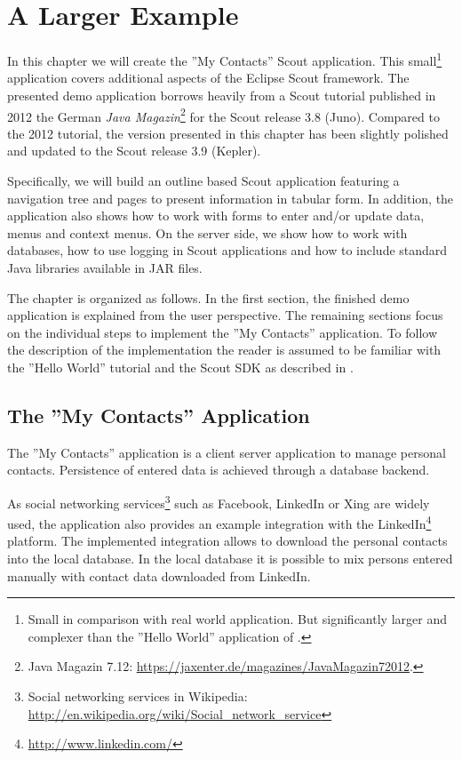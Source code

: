 \documentclass[a4paper,10pt,twoside]{book}
\begin{document}
  \sloppy
\fi

\chapter{A Larger Example}

In this chapter we will create the ''My Contacts'' Scout application.
This small\footnote{
Small in comparison with real world application. But significantly larger and complexer than the ''Hello World'' application of .
} application covers additional aspects of the Eclipse Scout framework. 
The presented demo application borrows heavily from a Scout tutorial published in 2012 the German \textit{Java Magazin}\footnote{
Java Magazin 7.12: \url{https://jaxenter.de/magazines/JavaMagazin72012}.
} 
for the Scout release 3.8 (Juno).
Compared to the 2012 tutorial, the version presented in this chapter has been slightly polished and updated to the Scout release 3.9 (Kepler).

Specifically, we will build an outline based Scout application featuring a navigation tree and pages to present information in tabular form. 
In addition, the application also shows how to work with forms to enter and/or update data, menus and context menus. 
On the server side, we show how to work with databases, how to use logging in Scout applications and how to include standard Java libraries available in JAR files. 

The chapter is organized as follows.
In the first section, the finished demo application is explained from the user perspective. 
The remaining sections focus on the individual steps to implement the ''My Contacts'' application. 
To follow the description of the implementation the reader is assumed to be familiar with the ''Hello World'' tutorial and the Scout SDK as described in . 

\section{The ''My Contacts'' Application}

The ''My Contacts'' application is a client server application to manage personal contacts. 
Persistence of entered data is achieved through a database backend. 

As social networking services\footnote{
Social networking services in Wikipedia: \url{http://en.wikipedia.org/wiki/Social_network_service}
} 
such as Facebook, LinkedIn or Xing are widely used, the application also provides an example integration with the LinkedIn\footnote{
\url{http://www.linkedin.com/}
} 
platform. 
The implemented integration allows to download the personal contacts into the local database. 
In the local database it is possible to mix persons entered manually with contact data downloaded from LinkedIn. 
\end{document}
